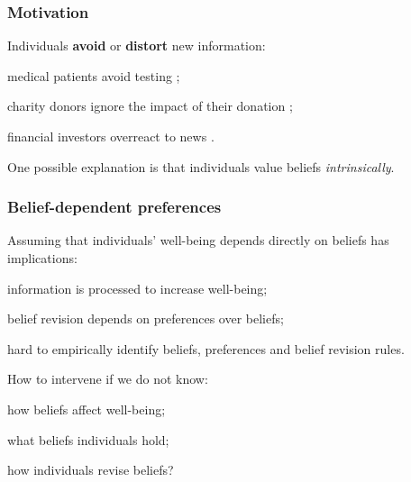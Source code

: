 \documentclass[usenames,dvipsnames,aspectratio=169,11pt]{beamer}
\begin{document}
\begin{frame}
	\maketitle

\end{frame}

\begin{frame}\frametitle{Motivation}

	Individuals \textbf{avoid} or \textbf{distort} new information:

	\vfill

	\begin{wideitemize}
		\item medical patients avoid testing \citep{golmanInformationAvoidance2017};
		\item charity donors ignore the impact of their donation \citep{niehausTheoryGoodIntentions2014};
		\item financial investors overreact to news \citep{danielOverconfidentInvestorsPredictable2015}.
	\end{wideitemize} \pause

	\vfill

	One possible explanation is that individuals value beliefs \textit{intrinsically}.

\end{frame}

\begin{frame}\frametitle{Belief-dependent preferences}

	Assuming that individuals' well-being depends directly on beliefs has implications:

	\vfill

	\begin{wideitemize}
		\item information is processed to increase well-being; \pause
		\item belief revision depends on preferences over beliefs; \pause
		\item hard to empirically identify beliefs, preferences and belief revision rules. \pause
	\end{wideitemize}

	\vfill

	How to intervene if we do not know:

	\vfill

	\begin{wideitemize}
		\item how beliefs affect well-being;
		\item what beliefs individuals hold;
		\item how individuals revise beliefs?
	\end{wideitemize}

\end{frame}
\end{document}
